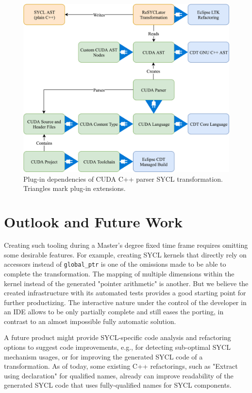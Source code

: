 \documentclass[sigconf]{acmart}
\newcommand{\tcode}[1]{\texttt{#1}}
\begin{document}
\begin{figure}[h]
  \centering
  \includegraphics[width=\linewidth]{ResultSchemaSimple}
  \caption{Plug-in dependencies of CUDA C++ parser SYCL transformation. Triangles mark plug-in extensions.}
  \label{fig:toolarch}
\end{figure}

\section{Outlook and Future Work}
Creating such tooling during a Master's degree fixed time frame requires omitting some desirable features. For example, creating SYCL kernels that directly rely on accessors instead of \tcode{global_ptr} is one of the omissions made to be able to complete the transformation. The mapping of multiple dimensions within the kernel instead of the generated "pointer arithmetic" is another. But we believe the created infrastructure with its automated tests provides a good starting point for further productizing. The interactive nature under the control of the developer in an IDE allows to be only partially complete and still eases the porting, in contrast to an almost impossible fully automatic solution. 

A future product might provide SYCL-specific code analysis and refactoring options to suggest code improvements, e.g., for detecting sub-optimal SYCL mechanism usages, or for improving the generated SYCL code of a transformation. As of today, some existing C++ refactorings, such as "Extract using declaration" for qualified names, already can improve readability of the generated SYCL code that uses fully-qualified names for SYCL components.
\end{document}
